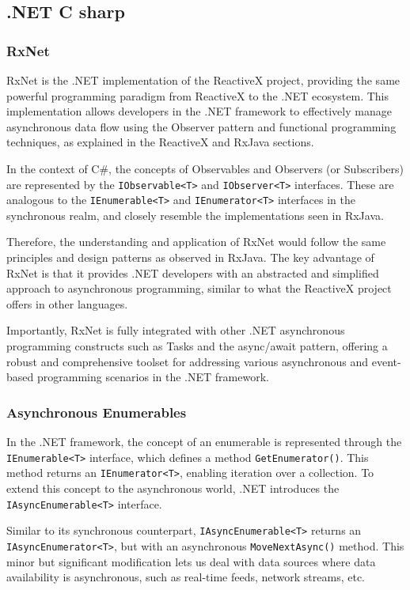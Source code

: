 \subsection {.NET C sharp}
\label{sec:csharp}


\subsubsection{RxNet}
\label{rxnet}

RxNet is the .NET implementation of the ReactiveX project, providing the same powerful programming paradigm from ReactiveX to the .NET ecosystem. This implementation allows developers in the .NET framework to effectively manage asynchronous data flow using the Observer pattern and functional programming techniques, as explained in the ReactiveX and RxJava sections.

In the context of C\#, the concepts of Observables and Observers (or Subscribers) are represented by the \texttt{IObservable<T>} and \texttt{IObserver<T>} interfaces. These are analogous to the \texttt{IEnumerable<T>} and \texttt{IEnumerator<T>} interfaces in the synchronous realm, and closely resemble the implementations seen in RxJava.

Therefore, the understanding and application of RxNet would follow the same principles and design patterns as observed in RxJava. The key advantage of RxNet is that it provides .NET developers with an abstracted and simplified approach to asynchronous programming, similar to what the ReactiveX project offers in other languages.

Importantly, RxNet is fully integrated with other .NET asynchronous programming constructs such as Tasks and the async/await pattern, offering a robust and comprehensive toolset for addressing various asynchronous and event-based programming scenarios in the .NET framework.

\subsubsection{Asynchronous Enumerables}
\label{csenums}
In the .NET framework, the concept of an enumerable is represented through the \texttt{IEnumerable<T>} interface, which defines a method \texttt{GetEnumerator()}. This method returns an \texttt{IEnumerator<T>}, enabling iteration over a collection. To extend this concept to the asynchronous world, .NET introduces the \texttt{IAsyncEnumerable<T>} interface.

Similar to its synchronous counterpart, \texttt{IAsyncEnumerable<T>} returns an \texttt{IAsyncEnumerator<T>}, but with an asynchronous \texttt{MoveNextAsync()} method. This minor but significant modification lets us deal with data sources where data availability is asynchronous, such as real-time feeds, network streams, etc.

